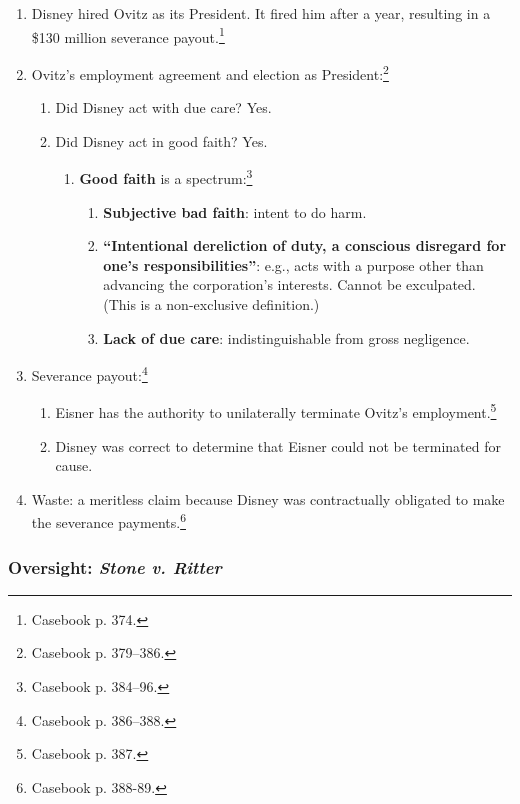 \begin{enumerate}
    \item Disney hired Ovitz as its President. It fired him after a year, 
    resulting in a \$130 million severance payout.\footnote{Casebook p. 374.}
    \item Ovitz's employment agreement and election as 
    President:\footnote{Casebook p. 379--386.}
    \begin{enumerate}
        \item Did Disney act with due care? Yes.
        \item Did Disney act in good faith? Yes.
        \begin{enumerate}
            \item \textbf{Good faith} is a spectrum:\footnote{Casebook p. 
            384--96.}
            \begin{enumerate}
                \item \textbf{Subjective bad faith}: intent to do harm.
                \item \textbf{``Intentional dereliction of duty, a conscious 
                disregard for one's responsibilities''}: e.g., acts with a 
                purpose other than advancing the corporation's interests. 
                Cannot be exculpated. (This is a non-exclusive definition.)
                \item \textbf{Lack of due care}: indistinguishable from gross 
                negligence.
            \end{enumerate}
        \end{enumerate}
    \end{enumerate}
    \item Severance payout:\footnote{Casebook p. 386--388.}
    \begin{enumerate}
        \item Eisner has the authority to unilaterally terminate Ovitz's 
        employment.\footnote{Casebook p. 387.}
        \item Disney was correct to determine that Eisner could not be 
        terminated for cause.
    \end{enumerate}
    \item Waste: a meritless claim because Disney was contractually obligated 
    to make the severance payments.\footnote{Casebook p. 388-89.}
\end{enumerate}

\subsubsection{Oversight: \emph{Stone v. Ritter}}

